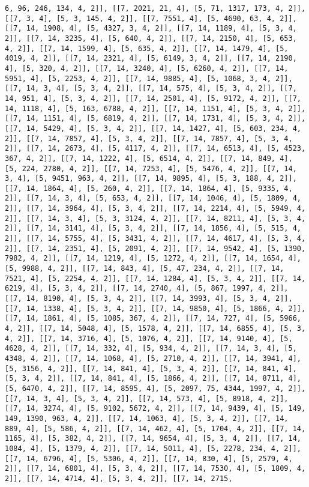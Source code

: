 \documentclass[12pt,fleqn]{article}\usepackage{../../common}
\begin{document}
\begin{verbatim}
6, 96, 246, 134, 4, 2]], [[7, 2021, 21, 4], [5, 71, 1317, 173, 4, 2]], [[7, 3, 4], [5, 3, 145, 4, 2]], [[7, 7551, 4], [5, 4690, 63, 4, 2]], [[7, 14, 1908, 4], [5, 4327, 3, 4, 2]], [[7, 14, 1189, 4], [5, 3, 4, 2]], [[7, 14, 3235, 4], [5, 640, 4, 2]], [[7, 14, 2150, 4], [5, 653, 4, 2]], [[7, 14, 1599, 4], [5, 635, 4, 2]], [[7, 14, 1479, 4], [5, 4019, 4, 2]], [[7, 14, 2321, 4], [5, 6149, 3, 4, 2]], [[7, 14, 2190, 4], [5, 320, 4, 2]], [[7, 14, 3240, 4], [5, 6260, 4, 2]], [[7, 14, 5951, 4], [5, 2253, 4, 2]], [[7, 14, 9885, 4], [5, 1068, 3, 4, 2]], [[7, 14, 3, 4], [5, 3, 4, 2]], [[7, 14, 575, 4], [5, 3, 4, 2]], [[7, 14, 951, 4], [5, 3, 4, 2]], [[7, 14, 2501, 4], [5, 9172, 4, 2]], [[7, 14, 1118, 4], [5, 163, 6788, 4, 2]], [[7, 14, 1151, 4], [5, 3, 4, 2]], [[7, 14, 1151, 4], [5, 6819, 4, 2]], [[7, 14, 1731, 4], [5, 3, 4, 2]], [[7, 14, 5429, 4], [5, 3, 4, 2]], [[7, 14, 1427, 4], [5, 603, 234, 4, 2]], [[7, 14, 7857, 4], [5, 3, 4, 2]], [[7, 14, 7857, 4], [5, 3, 4, 2]], [[7, 14, 2673, 4], [5, 4117, 4, 2]], [[7, 14, 6513, 4], [5, 4523, 367, 4, 2]], [[7, 14, 1222, 4], [5, 6514, 4, 2]], [[7, 14, 849, 4], [5, 224, 2780, 4, 2]], [[7, 14, 7253, 4], [5, 5476, 4, 2]], [[7, 14, 3, 4], [5, 9451, 963, 4, 2]], [[7, 14, 9895, 4], [5, 3, 188, 4, 2]], [[7, 14, 1864, 4], [5, 260, 4, 2]], [[7, 14, 1864, 4], [5, 9335, 4, 2]], [[7, 14, 3, 4], [5, 653, 4, 2]], [[7, 14, 1046, 4], [5, 1809, 4, 2]], [[7, 14, 3964, 4], [5, 3, 4, 2]], [[7, 14, 2214, 4], [5, 5949, 4, 2]], [[7, 14, 3, 4], [5, 3, 3124, 4, 2]], [[7, 14, 8211, 4], [5, 3, 4, 2]], [[7, 14, 3141, 4], [5, 3, 4, 2]], [[7, 14, 1856, 4], [5, 515, 4, 2]], [[7, 14, 5755, 4], [5, 3431, 4, 2]], [[7, 14, 4617, 4], [5, 3, 4, 2]], [[7, 14, 2351, 4], [5, 2091, 4, 2]], [[7, 14, 9542, 4], [5, 1390, 7982, 4, 2]], [[7, 14, 1219, 4], [5, 1272, 4, 2]], [[7, 14, 1654, 4], [5, 9988, 4, 2]], [[7, 14, 843, 4], [5, 47, 234, 4, 2]], [[7, 14, 7521, 4], [5, 2254, 4, 2]], [[7, 14, 1284, 4], [5, 3, 4, 2]], [[7, 14, 6219, 4], [5, 3, 4, 2]], [[7, 14, 2740, 4], [5, 867, 1997, 4, 2]], [[7, 14, 8190, 4], [5, 3, 4, 2]], [[7, 14, 3993, 4], [5, 3, 4, 2]], [[7, 14, 1338, 4], [5, 3, 4, 2]], [[7, 14, 9850, 4], [5, 1866, 4, 2]], [[7, 14, 1861, 4], [5, 1085, 367, 4, 2]], [[7, 14, 727, 4], [5, 5966, 4, 2]], [[7, 14, 5048, 4], [5, 1578, 4, 2]], [[7, 14, 6855, 4], [5, 3, 4, 2]], [[7, 14, 3716, 4], [5, 1076, 4, 2]], [[7, 14, 9140, 4], [5, 4628, 4, 2]], [[7, 14, 332, 4], [5, 934, 4, 2]], [[7, 14, 3, 4], [5, 4348, 4, 2]], [[7, 14, 1068, 4], [5, 2710, 4, 2]], [[7, 14, 3941, 4], [5, 3156, 4, 2]], [[7, 14, 841, 4], [5, 3, 4, 2]], [[7, 14, 841, 4], [5, 3, 4, 2]], [[7, 14, 841, 4], [5, 1866, 4, 2]], [[7, 14, 8711, 4], [5, 6470, 4, 2]], [[7, 14, 8595, 4], [5, 2097, 75, 4344, 1997, 4, 2]], [[7, 14, 3, 4], [5, 3, 4, 2]], [[7, 14, 573, 4], [5, 8918, 4, 2]], [[7, 14, 3274, 4], [5, 9102, 5672, 4, 2]], [[7, 14, 9439, 4], [5, 149, 149, 1390, 963, 4, 2]], [[7, 14, 1063, 4], [5, 3, 4, 2]], [[7, 14, 889, 4], [5, 586, 4, 2]], [[7, 14, 462, 4], [5, 1704, 4, 2]], [[7, 14, 1165, 4], [5, 382, 4, 2]], [[7, 14, 9654, 4], [5, 3, 4, 2]], [[7, 14, 1084, 4], [5, 1379, 4, 2]], [[7, 14, 5011, 4], [5, 2278, 234, 4, 2]], [[7, 14, 6796, 4], [5, 5306, 4, 2]], [[7, 14, 830, 4], [5, 2579, 4, 2]], [[7, 14, 6801, 4], [5, 3, 4, 2]], [[7, 14, 7530, 4], [5, 1809, 4, 2]], [[7, 14, 4714, 4], [5, 3, 4, 2]], [[7, 14, 2715, 
\end{verbatim}
\end{document}
